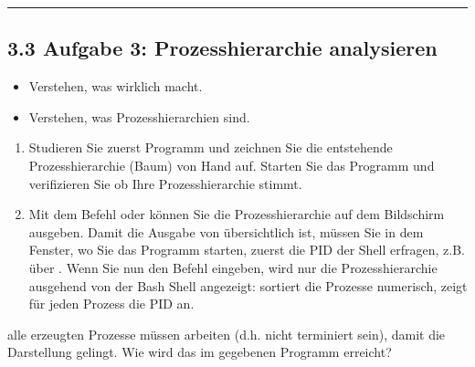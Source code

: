 \documentclass[a4paper,10pt,english]{report}
\begin{document}
\bigskip\hrule\bigskip



\subsection{3.3 Aufgabe 3: Prozesshierarchie analysieren}
\label{\detokenize{P07_Prozesse_und_Threads/README:aufgabe-3-prozesshierarchie-analysieren}}
\sphinxAtStartPar
{}
\begin{itemize}
\item {} 
\sphinxAtStartPar
Verstehen, was  wirklich macht.

\item {} 
\sphinxAtStartPar
Verstehen, was Prozesshierarchien sind.

\end{itemize}

\sphinxAtStartPar
{}
\begin{enumerate}
%
\item {} 
\sphinxAtStartPar
Studieren Sie zuerst Programm  und zeichnen Sie die entstehende Prozesshierarchie (Baum) von Hand auf. Starten Sie das Programm und verifizieren Sie ob Ihre Prozesshierarchie stimmt.

\item {} 
\sphinxAtStartPar
Mit dem Befehl  oder  können Sie die Prozesshierarchie auf dem Bildschirm ausgeben. Damit die Ausgabe von  übersichtlich ist, müssen Sie in dem Fenster, wo Sie das Programm  starten, zuerst die PID der Shell erfragen, z.B. über . Wenn Sie nun den Befehl  eingeben, wird nur die Prozesshierarchie ausgehend von der Bash Shell angezeigt:  sortiert die Prozesse numerisch,  zeigt für jeden Prozess die PID an.

\end{enumerate}

\sphinxAtStartPar
{} alle erzeugten Prozesse müssen arbeiten (d.h. nicht terminiert sein), damit die Darstellung gelingt. Wie wird das im gegebenen Programm erreicht?
\end{document}
